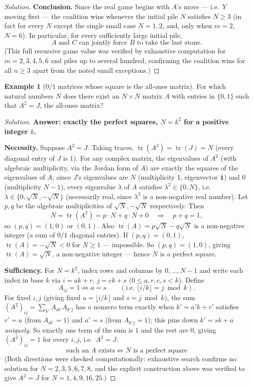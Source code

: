 \documentclass[11pt]{article}
\theoremstyle{definition}
\newtheorem{example}{Example}[section]
\begin{document}
\begin{proof}[Solution]
\textbf{Conclusion.} Since the real game begins with $A$'s move — i.e.\ $Y$ moving first — the coalition wins whenever the initial pile $N$ satisfies $N\ge3$ (in fact for every $N$ except the single small case $N=1,2$, and, only when $m=2$, $N=6$). In particular, for every sufficiently large initial pile,
\[
\boxed{A\text{ and }C\text{ can jointly force }B\text{ to take the last stone}}.
\]
(This full recursive game value was verified by exhaustive computation for $m=2,3,4,5,6$ and piles up to several hundred, confirming the coalition wins for all $n\ge3$ apart from the noted small exceptions.)
\end{proof}

\begin{example}[$0/1$ matrices whose square is the all-ones matrix]
For which natural numbers $N$ does there exist an $N\times N$ matrix $A$ with entries in $\{0,1\}$ such that $A^2=J$, the all-ones matrix?
\end{example}
\begin{proof}[Solution]
\textbf{Answer: exactly the perfect squares, $N=k^2$ for a positive integer $k$.}

\textbf{Necessity.} Suppose $A^2=J$. Taking traces, $\operatorname{tr}(A^2)=\operatorname{tr}(J)=N$ (every diagonal entry of $J$ is $1$). For any complex matrix, the eigenvalues of $A^2$ (with algebraic multiplicity, via the Jordan form of $A$) are exactly the squares of the eigenvalues of $A$; since $J$'s eigenvalues are $N$ (multiplicity $1$, eigenvector $\mathbf 1$) and $0$ (multiplicity $N-1$), every eigenvalue $\lambda$ of $A$ satisfies $\lambda^2\in\{0,N\}$, i.e.\ $\lambda\in\{0,\sqrt N,-\sqrt N\}$ (necessarily real, since $\lambda^2$ is a non-negative real number). Let $p,q$ be the algebraic multiplicities of $\sqrt N,-\sqrt N$ respectively. Then
\[
N=\operatorname{tr}(A^2)=p\cdot N+q\cdot N+0\quad\Longrightarrow\quad p+q=1,
\]
so $(p,q)=(1,0)$ or $(0,1)$. Also $\operatorname{tr}(A)=p\sqrt N-q\sqrt N$ is a non-negative integer (a sum of $0/1$ diagonal entries). If $(p,q)=(0,1)$, $\operatorname{tr}(A)=-\sqrt N<0$ for $N\ge1$ — impossible. So $(p,q)=(1,0)$, giving $\operatorname{tr}(A)=\sqrt N$, a non-negative integer — hence $N$ is a perfect square.

\textbf{Sufficiency.} For $N=k^2$, index rows and columns by $0,\dots,N-1$ and write each index in base $k$ via $i=ak+r$, $j=ck+s$ ($0\le a,r,c,s<k$). Define
\[
A_{ij}=1\iff a=s\qquad(\text{i.e.\ }\lfloor i/k\rfloor = j\bmod k).
\]
For fixed $i,j$ (giving fixed $a=\lfloor i/k\rfloor$ and $s=j\bmod k$), the sum $(A^2)_{ij}=\sum_{k'}A_{ik'}A_{k'j}$ has a nonzero term exactly when $k'=a'k+r'$ satisfies $r'=a$ (from $A_{ik'}=1$) and $a'=s$ (from $A_{k'j}=1$); this pins down $k'=sk+a$ \emph{uniquely}. So exactly one term of the sum is $1$ and the rest are $0$, giving $(A^2)_{ij}=1$ for every $i,j$, i.e.\ $A^2=J$.
\[
\boxed{\text{such an } A \text{ exists} \iff N \text{ is a perfect square}}
\]
(Both directions were checked computationally: exhaustive search confirms no solution for $N=2,3,5,6,7,8$, and the explicit construction above was verified to give $A^2=J$ for $N=1,4,9,16,25$.)
\end{proof}
\end{document}
